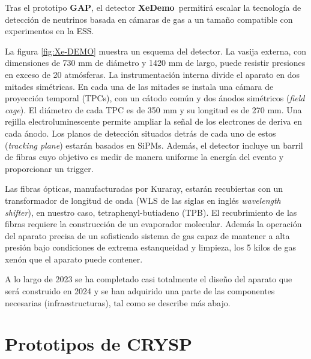 \documentclass[12pt,a4paper,article]{report} %
\def\xed{{\bf XeDemo}}
\def\crysp{{\bf CRYSP }}
\begin{document}
Tras el prototipo {\bf GAP}, el detector
\xed\ permitirá escalar la tecnología de detección de neutrinos basada en cámaras de gas a un tamaño compatible con experimentos en la ESS.

La figura \ref{fig:Xe-DEMO}  muestra un esquema del detector. La vasija externa, con dimensiones de 730 mm de diámetro y 1420 mm de largo, puede resistir presiones en exceso de 20 atmósferas. La instrumentación interna divide el aparato en dos mitades simétricas. En cada una de las mitades se instala una cámara de proyección temporal (TPCs), con un cátodo común y dos ánodos simétricos ({\em field cage}). El diámetro de cada TPC es de 350 mm y su longitud es de 270 mm.  Una rejilla electroluminescente permite ampliar la señal de los electrones de deriva en cada ánodo. Los planos de detección situados detrás de cada uno de estos ({\em tracking plane}) estarán basados en SiPMs. Además, el detector incluye un barril de fibras cuyo objetivo es medir de manera uniforme la energía del evento y proporcionar un trigger. 

Las fibras ópticas, manufacturadas por Kuraray, estarán recubiertas con un transformador de longitud de onda (WLS de las siglas en inglés {\em wavelength shifter}), en nuestro caso, tetraphenyl-butiadeno (TPB). El recubrimiento de las fibras requiere la construcción de un evaporador molecular. Además la operación del aparato precisa de un sofisticado sistema de gas capaz de mantener a alta presión bajo condiciones de extrema estanqueidad y limpieza, los 5 kilos de gas xenón que el aparato puede contener. 

A lo largo de 2023 se ha completado casi totalmente el diseño del aparato que será construido en 2024 y se han adquirido una parte de las componentes necesarias (infraestructuras), tal como se describe más abajo.  


\section*{Prototipos de \crysp}
\end{document}
